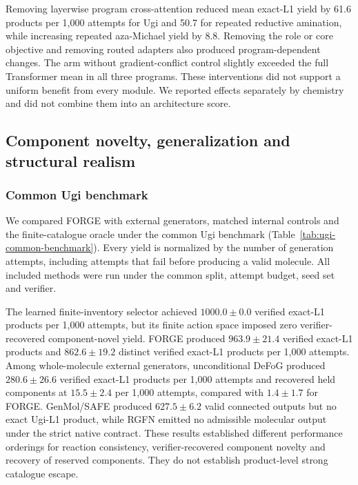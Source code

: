 \documentclass{article}
\theoremstyle{definition}
\newcommand{\ForgeProseCommonDefogExactPerThousand}{$280.6\pm26.6$}
\newcommand{\ForgeProseCommonDefogHeldPerThousand}{$15.5\pm2.4$}
\newcommand{\ForgeProseCommonForgeDistinctPerThousand}{$862.6\pm19.2$}
\newcommand{\ForgeProseCommonForgeExactPerThousand}{$963.9\pm21.4$}
\newcommand{\ForgeProseCommonForgeHeldPerThousand}{$1.4\pm1.7$}
\newcommand{\ForgeProseCommonGenmolValidPerThousand}{$627.5\pm6.2$}
\newcommand{\ForgeProseCommonSelectorExactPerThousand}{$1000.0\pm0.0$}
\newcommand{\ForgeProseNoCrossAttentionBLIncrease}{8.8}
\newcommand{\ForgeProseNoCrossAttentionLXReduction}{50.7}
\newcommand{\ForgeProseNoCrossAttentionUgiReduction}{61.6}
\begin{document}
Removing layerwise program cross-attention reduced mean exact-L1 yield by
\ForgeProseNoCrossAttentionUgiReduction{} products per 1,000 attempts for Ugi and
\ForgeProseNoCrossAttentionLXReduction{} for repeated reductive amination, while increasing repeated
aza-Michael yield by \ForgeProseNoCrossAttentionBLIncrease{}. Removing the role or core objective and
removing routed adapters also produced
program-dependent changes. The arm without gradient-conflict control slightly exceeded the full
Transformer mean in all three programs. These interventions did not support a uniform benefit
from every module. We reported effects separately by chemistry and did not combine them into an
architecture score.

\FloatBarrier
\subsection{Component novelty, generalization and structural realism}
\label{app:novelty-results}

\subsubsection{Common Ugi benchmark}

\label{app:reporting}

We compared FORGE with external generators, matched internal controls and the finite-catalogue
oracle under the common Ugi benchmark (Table~\ref{tab:ugi-common-benchmark}).
Every yield is normalized by the number of generation attempts, including attempts that fail before
producing a valid molecule.
All included methods were run under the common split, attempt budget, seed set and verifier.



The learned finite-inventory selector achieved \ForgeProseCommonSelectorExactPerThousand{} verified
exact-L1 products per 1,000
attempts, but its finite action space imposed zero verifier-recovered component-novel yield. FORGE
produced \ForgeProseCommonForgeExactPerThousand{} verified exact-L1 products and
\ForgeProseCommonForgeDistinctPerThousand{} distinct verified exact-L1 products per 1,000 attempts.
Among whole-molecule external generators, unconditional DeFoG produced
\ForgeProseCommonDefogExactPerThousand{} verified exact-L1 products per 1,000 attempts and recovered
held components at \ForgeProseCommonDefogHeldPerThousand{} per 1,000 attempts, compared with
\ForgeProseCommonForgeHeldPerThousand{} for FORGE. GenMol/SAFE produced
\ForgeProseCommonGenmolValidPerThousand{} valid connected outputs but no exact Ugi-L1 product, while
RGFN emitted no admissible
molecular output under the strict native contract. These results established different performance orderings for
reaction consistency, verifier-recovered component novelty and recovery of reserved components. They do not establish product-level strong catalogue escape.
\end{document}
